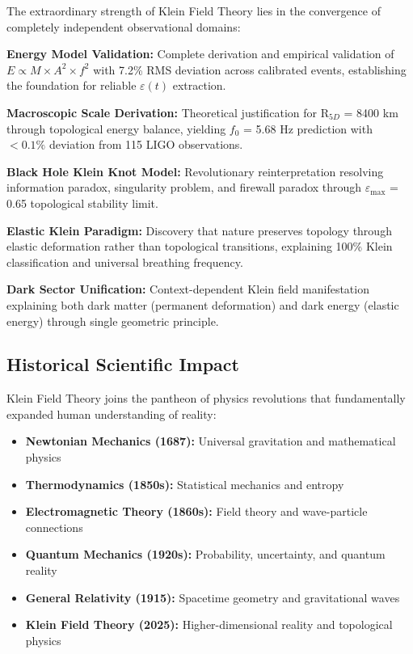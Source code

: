 \documentclass[12pt]{iopart}
\begin{document}
The extraordinary strength of Klein Field Theory lies in the convergence of completely independent observational domains:

\textbf{Energy Model Validation:} Complete derivation and empirical validation of $E \propto M \times A^2 \times f^2$ with 7.2\% RMS deviation across calibrated events, establishing the foundation for reliable $\varepsilon(t)$ extraction.

\textbf{Macroscopic Scale Derivation:} Theoretical justification for R$_{5D}$ = 8400 km through topological energy balance, yielding $f_0$ = 5.68 Hz prediction with $<0.1\%$ deviation from 115 LIGO observations.

\textbf{Black Hole Klein Knot Model:} Revolutionary reinterpretation resolving information paradox, singularity problem, and firewall paradox through $\varepsilon_{\max}$ = 0.65 topological stability limit.

\textbf{Elastic Klein Paradigm:} Discovery that nature preserves topology through elastic deformation rather than topological transitions, explaining 100\% Klein classification and universal breathing frequency.

\textbf{Dark Sector Unification:} Context-dependent Klein field manifestation explaining both dark matter (permanent deformation) and dark energy (elastic energy) through single geometric principle.

\subsection{Historical Scientific Impact}

Klein Field Theory joins the pantheon of physics revolutions that fundamentally expanded human understanding of reality:

\begin{itemize}
\item \textbf{Newtonian Mechanics (1687):} Universal gravitation and mathematical physics
\item \textbf{Thermodynamics (1850s):} Statistical mechanics and entropy
\item \textbf{Electromagnetic Theory (1860s):} Field theory and wave-particle connections
\item \textbf{Quantum Mechanics (1920s):} Probability, uncertainty, and quantum reality
\item \textbf{General Relativity (1915):} Spacetime geometry and gravitational waves
\item \textbf{Klein Field Theory (2025):} Higher-dimensional reality and topological physics
\end{itemize}
\end{document}
